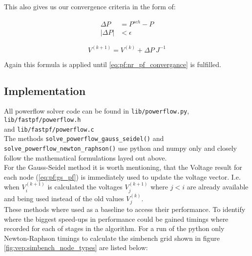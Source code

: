 This also gives us our convergence criteria in the form of:

\begin{align}
    \Delta P &= P^{sch} - P\\
    |\Delta P| &< \epsilon
    \label{eq:pf:nr_pf_convergance}
\end{align}

\begin{equation}
    V^{(k+1)} = V^{(k)} + \Delta P \ J^{-1}
\end{equation}

Again this formula is applied until \ref{eq:pf:nr_pf_convergance} is fulfilled.

\subsection{Implementation}

All powerflow solver code can be found in 
\texttt{lib/powerflow.py}, \texttt{lib/fastpf/powerflow.h}
\\ and
\texttt{lib/fastpf/powerflow.c}\\

The methods \texttt{solve\_powerflow\_gauss\_seidel()}
and \texttt{solve\_powerflow\_newton\_raphson()}
use python and numpy only and closely follow the mathematical formulations layed out above.\\

For the Gauss-Seidel method it is worth mentioning, that the Voltage result for each
node (\ref{eq:pf:gs_pf}) is immediately used to update the voltage vector. I.e. when $V_i^{(k+1)}$
is calculated the voltages $V_{j}^{(k+1)}$ where $j<i$ are already available and being used instead of
the old values $V_{j}^{(k)}$.\\

These methods where used as a baseline to access their performance. To identify where the biggest
speed-ups in performance could be gained timings where recorded for each of stages in the algorithm.
For a run of the python only Newton-Raphson timings to calculate the simbench grid shown in figure
\ref{fig:vep:simbench_node_types} are listed below:

\vspace{.5cm}

